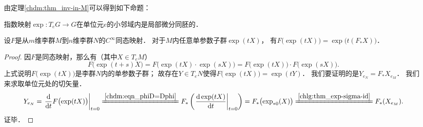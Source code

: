 由定理\ref{chdm:thm_inv-in-M}可以得到如下命题：
\begin{proposition}\label{chlg:thm_exp-sigma-id-cor1}
    指数映射$\exp : T_e G \to G$在单位元$e$的小邻域内是局部微分同胚的．
\end{proposition}



\begin{theorem}\label{chlg:thm_feef}
    设$F$是从$m$维李群$M$到$n$维李群$N$的$C^\infty$同态映射．
    对于$M$内任意单参数子群$\exp (tX)$，
    有$F\bigl(\exp (tX)\bigr) = \exp \bigl(t (F_{*} X)\bigr)$．
\end{theorem}
\begin{proof}
    因$F$是同态映射，那么有（其中$X\in T_eM$）
    \begin{equation*}
        F\bigl(\exp (t+s)X\bigr)=F\bigl(\exp (tX) \cdot \exp (sX) \bigr)
        =F\bigl(\exp (tX) \bigr)\cdot F\bigl( \exp (sX) \bigr) .
    \end{equation*}
    上式说明$F\bigl(\exp (tX)\bigr)$是李群$N$内的单参数子群；
    故存在$Y\in T_eN$使得$F\bigl(\exp (tX)\bigr)= \exp(tY)$．
    我们要证明的是$Y_{e_N} = F_* X_{e_M}$．
    我们来求取单位元处的切矢量．
    \setlength{\mathindent}{0em}
    \begin{equation*}
        Y_{e_N}=
        \left.\frac{{\rm d}}{{\rm d} t}F\bigl(\exp (tX)\bigr)\right|_{t=0}
        \xlongequal{\ref{chdm:eqn_phiD=Dphi}}
        F_{*} \left(\left.\frac{{\rm d}\exp (tX)}{{\rm d} t}\right|_{t=0} \right)
        =F_{*} \bigl(\exp_{*0}(X) \bigr)   
        \xlongequal{\ref{chlg:thm_exp-sigma-id}}F_{*} (X_{e_M}) .
    \end{equation*} \setlength{\mathindent}{2em}
    证毕．
\end{proof}


